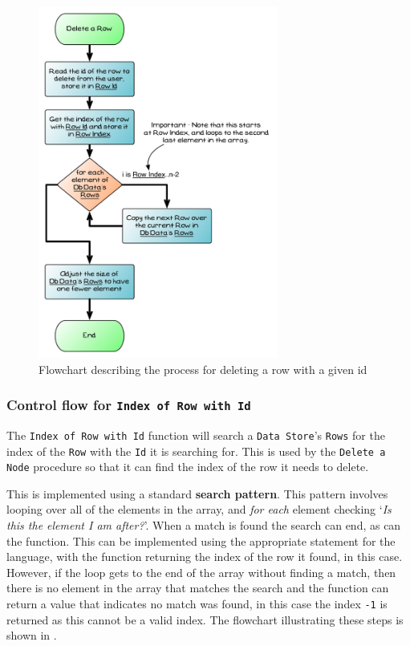\begin{figure}[htbp]
   \centering
   \includegraphics[width=0.7\textwidth]{./topics/dynamic-memory/diagrams/DeleteFlow} 
   \caption{Flowchart describing the process for deleting a row with a given id}
   \label{fig:delete-a-row-flow}
\end{figure}



\subsubsection{Control flow for \texttt{Index of Row with Id}} %
\label{ssub:control_flow_for_index of row with id}

The \texttt{Index of Row with Id} function will search a \texttt{Data Store}'s \texttt{Rows} for the index of the \texttt{Row} with the \texttt{Id} it is searching for. This is used by the \texttt{Delete a Node} procedure so that it can find the index of the row it needs to delete.

This is implemented using a standard \textbf{search pattern}. This pattern involves looping over all of the elements in the array, and \emph{for each} element checking `\emph{Is this the element I am after?}'. When a match is found the search can end, as can the function. This can be implemented using the appropriate  statement for the language, with  the function returning the index of the row it found, in this case. However, if the loop gets to the end of the array without finding a match, then there is no element in the array that matches the search and the function can return a value that indicates no match was found, in this case the index \texttt{-1} is returned as this cannot be a valid index. The flowchart illustrating these steps is shown in .

